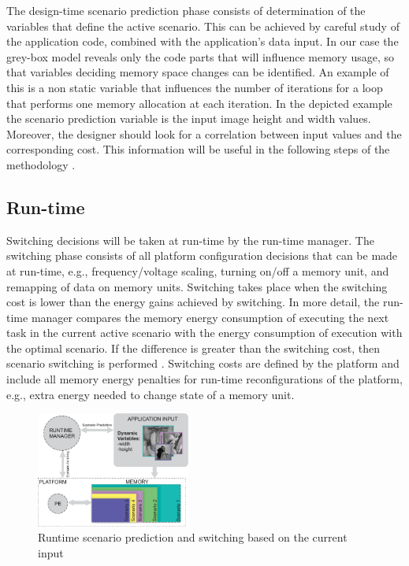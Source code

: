 \documentclass[a4paper,conference]{IEEEtran}
\begin{document}
The design-time scenario prediction phase consists of determination of the variables that define the active scenario. This can be achieved by careful study of the application code, combined with the application's data input. In our case the grey-box model reveals only the code parts that will influence memory usage, so that variables deciding memory space changes can be identified. An example of this is a non static variable that influences the number of iterations for a loop that performs one memory allocation at each iteration. In the depicted example the scenario prediction variable is the input image height and width values. Moreover, the designer should look for a correlation between input values and the corresponding cost. This information will be useful in the following steps of the methodology \cite{tcm}.

\subsection{Run-time}

Switching decisions will be taken at run-time by the run-time manager. The switching phase consists of all platform configuration decisions that can be made at run-time, e.g., frequency/voltage scaling, turning on/off a memory unit, and remapping of data on memory units. Switching takes place when the switching cost is lower than the energy gains achieved by switching. In more detail, the run-time manager compares the memory energy consumption of executing the next task in the current active scenario with the energy consumption of execution with the optimal scenario. If the difference is greater than the switching cost, then scenario switching is performed \cite{tcm}. Switching costs are defined by the platform and include all memory energy penalties for run-time reconfigurations of the platform, e.g., extra energy needed to change state of a memory unit.

\begin{figure}[!t]
\centering
\includegraphics[width=0.45\textwidth]{Images/switching.eps}
\caption{Runtime scenario prediction and switching based on the current input}
\label{fig:runtime}
\end{figure}
\end{document}
